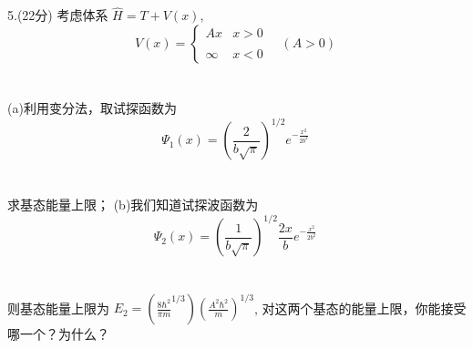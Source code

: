 5.(22分) 考虑体系 $\hat{H} = T + V(x)$,
  $$ V(x) = \begin{cases}     A x & x > 0 \\\\     \infty & x < 0     \end{cases} \quad (A > 0)~$$\\\\
 (a)利用变分法，取试探函数为
  $$\Psi_1(x) = \left( \frac{2}{b\sqrt{\pi}} \right)^{1/2} e^{-\frac{x^2}{2b^2}}~$$\\\\
求基态能量上限；
 (b)我们知道试探波函数为
$$\Psi_2(x) = \left( \frac{1}{b\sqrt{\pi}} \right)^{1/2} \frac{2x}{b} e^{-\frac{x^2}{2b^2}} ~$$\\\\
则基态能量上限为 $E_2 =  (\frac{8\hbar^2}{\pi m}^{1/3}) \left( \frac{A^2 \hbar^2}{m} \right)^{1/3}$, 对这两个基态的能量上限，你能接受哪一个？为什么？

